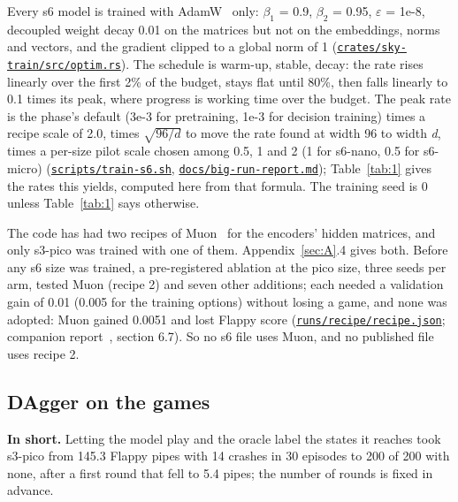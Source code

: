 \documentclass[10pt]{article}
\begin{document}
Every s6 model is trained with AdamW~\cite{loshchilov2019adamw} only: $\beta_{1}$ = 0.9, $\beta_{2}$ = 0.95, $\varepsilon$ = 1e-8, decoupled weight decay 0.01 on the matrices but not on the embeddings, norms and vectors, and the gradient clipped to a global norm of 1 (\href{https://github.com/maxgfr/skycmd/blob/main/crates/sky-train/src/optim.rs}{\texttt{crates/\allowbreak{}sky-train/\allowbreak{}src/\allowbreak{}optim.rs}}). The schedule is warm-up, stable, decay: the rate rises linearly over the first 2\% of the budget, stays flat until 80\%, then falls linearly to 0.1 times its peak, where progress is working time over the budget. The peak rate is the phase's default (3e-3 for pretraining, 1e-3 for decision training) times a recipe scale of 2.0, times $\sqrt{96/d}$ to move the rate found at width 96 to width \emph{d}, times a per-size pilot scale chosen among 0.5, 1 and 2 (1 for s6-nano, 0.5 for s6-micro) (\href{https://github.com/maxgfr/skycmd/blob/main/scripts/train-s6.sh}{\texttt{scripts/\allowbreak{}train-s6.sh}}, \href{https://github.com/maxgfr/skycmd/blob/main/docs/big-run-report.md}{\texttt{docs/\allowbreak{}big-run-report.md}}); Table~\ref{tab:1} gives the rates this yields, computed here from that formula. The training seed is 0 unless Table~\ref{tab:1} says otherwise.

The code has had two recipes of Muon~\cite{jordan2024muon} for the encoders' hidden matrices, and only s3-pico was trained with one of them. Appendix~\ref{sec:A}.4 gives both. Before any s6 size was trained, a pre-registered ablation at the pico size, three seeds per arm, tested Muon (recipe 2) and seven other additions; each needed a validation gain of 0.01 (0.005 for the training options) without losing a game, and none was adopted: Muon gained 0.0051 and lost Flappy score (\href{https://github.com/maxgfr/skycmd/blob/main/runs/recipe/recipe.json}{\texttt{runs/\allowbreak{}recipe/\allowbreak{}recipe.json}}; companion report~\cite{golfier2026skycmd}, section 6.7). So no s6 file uses Muon, and no published file uses recipe 2.

\subsection{DAgger on the games}\label{sec:4.5}

\textbf{In short.} Letting the model play and the oracle label the states it reaches took s3-pico from 145.3 Flappy pipes with 14 crashes in 30 episodes to 200 of 200 with none, after a first round that fell to 5.4 pipes; the number of rounds is fixed in advance.
\end{document}
